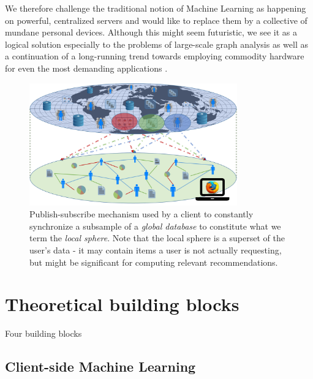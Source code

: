\documentclass{llncs}
\begin{document}
We therefore challenge the traditional notion of Machine Learning as happening on powerful, centralized servers and would like to replace them by a collective of mundane personal devices. Although this might seem futuristic, we see it as a logical solution especially to the problems of large-scale graph analysis \cite{leskovec2006samplinggraphs} as well as a continuation of a long-running trend towards employing commodity hardware for even the most demanding applications \cite{al2008scalable}.


\begin{figure}[H]
	\begin{center}
		\includegraphics[width=0.8\textwidth]{figures/local_sphere}
		\caption{Publish-subscribe mechanism used by a client to constantly synchronize a subsample of a \textit{global database} to constitute what we term the \textit{local sphere}. Note that the local sphere is a superset of the user's data - it may contain items a user is not actually requesting, but might be significant for computing relevant recommendations.}
		\label{fig:local_sphere}
	\end{center}
\end{figure}



\section{Theoretical building blocks}
\label{sect:bg_related}

Four building blocks


\subsection{Client-side Machine Learning}
\label{ssect:cs_ML}

\cite{2003automaticKEfromWebDocuments}
\cite{mcmahan2016communication}
\cite{konevcny2016federatedlearning}
\cite{konevcny2016federatedoptimization}
\cite{2017secureaggregation}
\end{document}
